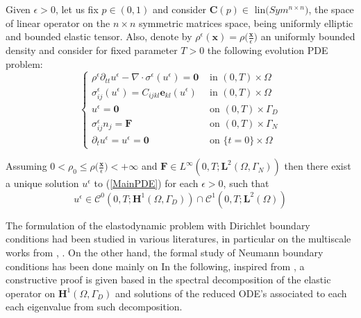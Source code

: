 Given $\epsilon > 0$, let us fix $p \in (0,1)$ and consider $\mathbf{C}(p) \in \text{ lin}\big(Sym^{n\times n})$, the space of linear operator on the $n\times n$ symmetric matrices space, being uniformly elliptic and bounded elastic tensor. Also, denote by $\rho^{\epsilon}(\mathbf{x}) = \rho \big( \frac{\mathbf{x}}{\epsilon}\big)$ an uniformly bounded density and consider for fixed parameter $T > 0$ the following evolution PDE problem:
\begin{equation}
    \label{MainPDE}
    \left \{
    \begin{array}{cc}
        \rho^{\epsilon} \partial_{tt} u^{\epsilon} - \nabla\cdot \sigma^{\epsilon}(u^{\epsilon})= \mathbf{0} & \text{ in } (0,T) \times \Omega \\
        \sigma^{\epsilon}_{ij}(u^{\epsilon}) = C_{ijkl} \mathbf{e}_{kl}(u^{\epsilon}) & \text{ in } (0,T)\times \Omega \\
        u^{\epsilon} = \mathbf{0} & \text{ on } (0,T) \times \Gamma_D \\
        \sigma^{\epsilon}_{ij} n_j = \mathbf{F} & \text{ on } (0,T) \times \Gamma_N \\
        \partial_t u^{\epsilon} = u^{\epsilon} = \mathbf{0} & \text{ on } \{t=0\} \times \Omega
    \end{array}
    \right.
\end{equation}
\begin{prop}
Assuming $0 < \rho_0 \leq \rho\big( \frac{\mathbf{x}}{\epsilon} \big) < + \infty$ and $\mathbf{F} \in L^{\infty}(0,T;\mathbf{L}^2(\Omega,\Gamma_N))$ then there exist a unique solution $u^{\epsilon}$ to (\ref{MainPDE}) for each $\epsilon > 0$, such that
\begin{equation*}
    u^{\epsilon} \in \mathcal{C}^0(0,T;\mathbf{H}^1(\Omega,\Gamma_D)) \cap \mathcal{C}^1(0,T;\mathbf{L}^2(\Omega))
\end{equation*}
\end{prop}

\begin{rem}
The formulation of the elastodynamic problem with Dirichlet boundary conditions had been studied in various literatures, in particular on the multiscale works from \cite{panasenko2005multi-scale}, \cite{bakhvalov1989homogenisation:}. On the other hand, the formal study of Neumann boundary conditions has been done mainly on \cite{oleinik1992mathematical}
In the following, inspired from \cite{raviart1983introduction}, a constructive proof is given based in the spectral decomposition of the elastic operator on $\mathbf{H}^1(\Omega, \Gamma_D)$ and solutions of the reduced ODE's associated to each each eigenvalue from such decomposition.
\end{rem}



